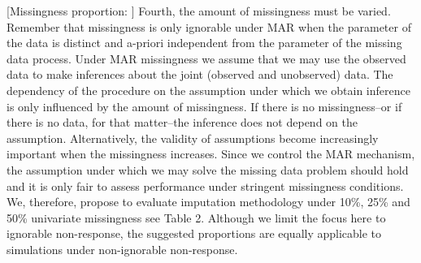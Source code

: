 \documentclass[bimj,fleqn]{w-art}
\begin{document}
[Missingness proportion: ]
Fourth, the amount of missingness must be varied. Remember that missingness is only ignorable under MAR when the parameter of the data is distinct and a-priori independent from the parameter of the missing data process. Under MAR missingness we assume that we may use the observed data to make inferences about the joint (observed and unobserved) data. The dependency of the procedure on the assumption under which we obtain inference is only influenced by the amount of missingness. If there is no missingness--or if there is no data, for that matter--the inference does not depend on the assumption. Alternatively, the validity of assumptions become increasingly important when the missingness increases. Since we control the MAR mechanism, the assumption under which we may solve the missing data problem should hold and it is only fair to assess performance under stringent missingness conditions. We, therefore, propose to evaluate imputation methodology under 10\%, 25\% and 50\% univariate missingness see Table 2. Although we limit the focus here to ignorable non-response, the suggested proportions are equally applicable to simulations under non-ignorable non-response.
\end{document}
